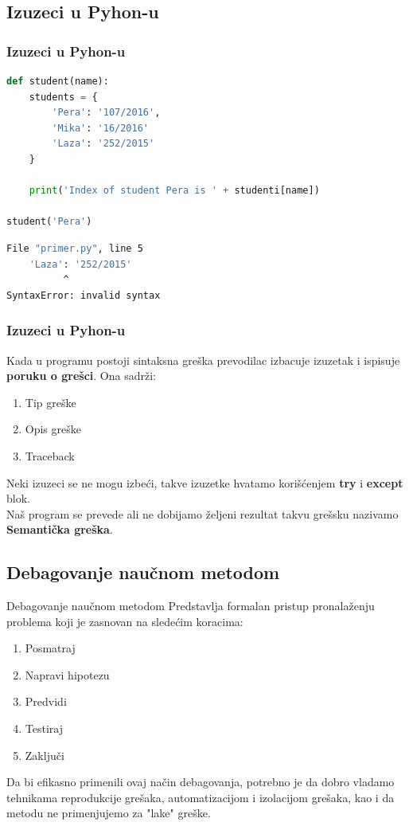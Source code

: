 \documentclass{beamer}
\begin{document}
\subsection{Izuzeci u Pyhon-u}
\begin{frame}[fragile]
\frametitle{Izuzeci u Pyhon-u}
\begin{exampleblock}{}
\begin{lstlisting}[language = python]
def student(name):
    students = {
        'Pera': '107/2016',
        'Mika': '16/2016'
        'Laza': '252/2015'
    }

    print('Index of student Pera is ' + studenti[name])

student('Pera')
\end{lstlisting}
\end{exampleblock}
\begin{exampleblock}{}
\begin{lstlisting}[language = bash]
  File "primer.py", line 5
    'Laza': '252/2015'
          ^
SyntaxError: invalid syntax
\end{lstlisting}
\end{exampleblock}
\end{frame}
\begin{frame}
\frametitle{Izuzeci u Pyhon-u}
Kada u programu postoji sintaksna greška prevodilac izbacuje izuzetak i ispisuje \textbf{poruku o grešci}. Ona sadrži:
\begin{enumerate}
    \item Tip greške
    \item Opis greške
    \item Traceback
\end{enumerate}
Neki izuzeci se ne mogu izbeći, takve izuzetke hvatamo korišćenjem \textbf{try} i \textbf{except} blok. \\
Naš program se prevede ali ne dobijamo željeni rezultat takvu grešsku nazivamo \textbf{Semantička greška}. 
\end{frame}
\subsection{Debagovanje naučnom metodom}
\begin{frame}{Debagovanje naučnom metodom}
Predstavlja formalan pristup pronalaženju problema koji je zasnovan na sledećim koracima:
\begin{enumerate}
    \item Posmatraj
    \item Napravi hipotezu
    \item Predvidi
    \item Testiraj
    \item Zaključi
\end{enumerate}
Da bi efikasno primenili ovaj način debagovanja, potrebno je da dobro vladamo tehnikama reprodukcije grešaka, automatizacijom i izolacijom grešaka, kao i da metodu ne primenjujemo za "lake" greške.
\end{frame}
\end{document}
